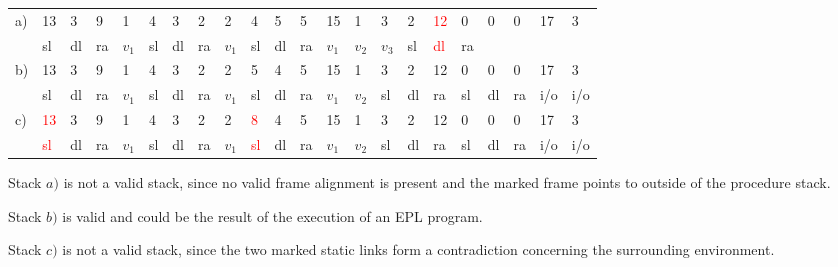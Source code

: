 \begin{tabular}{*{22}{|l}|}
\hline
a)&13 & 3 & 9 & 1 & 4 & 3 & 2 & 2 & 4 & 5 & 5 & 15 & 1 & 3 & 2 & \textcolor{red}{12} & 0 & 0 & 0 & 17 & 3  \\
&sl & dl & ra & $v_1$ & sl & dl & ra & $v_1$ & sl & dl & ra & $v_1$ & $v_2$ & $v_3$ & sl & \textcolor{red}{dl} & ra & & & &   \\ \hline \hline
b)&13 & 3 & 9 & 1 & 4 & 3 & 2 & 2 & 5 & 4 & 5 & 15 & 1 & 3 & 2 & 12 & 0 & 0 & 0 & 17 & 3  \\
&sl & dl & ra & $v_1$ & sl & dl & ra & $v_1$ & sl & dl & ra & $v_1$ & $v_2$ & sl & dl & ra & sl & dl & ra & i/o &  i/o \\ \hline \hline
c)&\textcolor{red}{13} & 3 & 9 & 1 & 4 & 3 & 2 & 2 & \textcolor{red}{8} & 4 & 5 & 15 & 1 & 3 & 2 & 12 & 0 & 0 & 0 & 17 & 3  \\ 
&\textcolor{red}{sl} & dl & ra & $v_1$ & sl & dl & ra & $v_1$ & \textcolor{red}{sl} & dl & ra & $v_1$ & $v_2$ & sl & dl & ra & sl & dl & ra & i/o &  i/o \\ \hline
\end{tabular}

Stack $a)$ is not a valid stack, since no valid frame alignment is present and the marked frame points to outside of the procedure stack.

Stack $b)$ is valid and could be the result of the execution of an EPL program.

Stack $c)$ is not a valid stack, since the two marked static links form a contradiction concerning the surrounding environment.